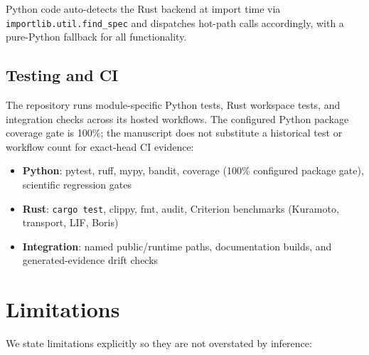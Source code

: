 \documentclass[twocolumn,preprintnumbers,amsmath,amssymb,prl,floatfix]{revtex4-2}
\begin{document}
Python code auto-detects the Rust backend at import time
via \texttt{importlib.util.find\_spec} and dispatches
hot-path calls accordingly, with a pure-Python fallback
for all functionality.

\subsection{Testing and CI}

The repository runs module-specific Python tests, Rust workspace tests, and
integration checks across its hosted workflows. The configured Python package
coverage gate is 100\%; the manuscript does not substitute a historical test or
workflow count for exact-head CI evidence:
\begin{itemize}
  \item \textbf{Python}: pytest, ruff, mypy, bandit, coverage
        (100\% configured package gate), scientific regression gates
  \item \textbf{Rust}: \texttt{cargo test}, clippy, fmt, audit,
        Criterion benchmarks (Kuramoto, transport, LIF, Boris)
  \item \textbf{Integration}: named public/runtime paths, documentation builds,
        and generated-evidence drift checks
\end{itemize}


\section{Limitations}
\label{sec:limitations}

We state limitations explicitly so they are not overstated
by inference:
\end{document}
